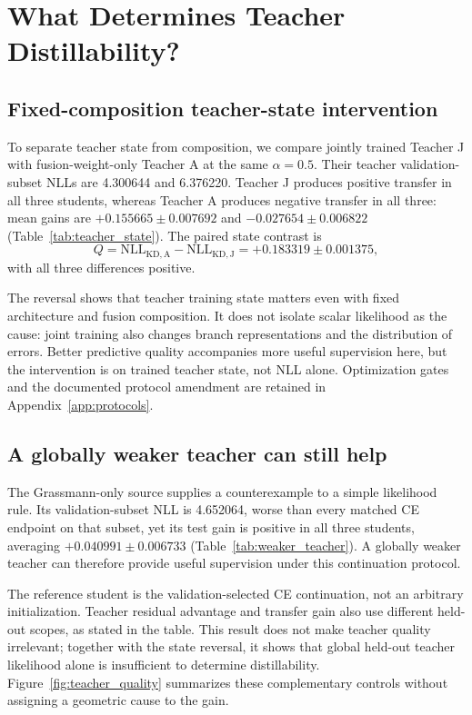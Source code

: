\section{What Determines Teacher Distillability?}
\label{sec:distillability}

\subsection{Fixed-composition teacher-state intervention}
\label{sec:teacher-state}

To separate teacher state from composition, we compare jointly trained Teacher J with fusion-weight-only Teacher A at the same $\alpha=0.5$. Their teacher validation-subset NLLs are 4.300644 and 6.376220. Teacher J produces positive transfer in all three students, whereas Teacher A produces negative transfer in all three: mean gains are $+0.155665\pm0.007692$ and $-0.027654\pm0.006822$ (Table~\ref{tab:teacher_state}). The paired state contrast is
\begin{equation}
Q=\mathrm{NLL}_{\mathrm{KD,A}}-\mathrm{NLL}_{\mathrm{KD,J}}
=+0.183319\pm0.001375,
\label{eq:teacher-state-contrast}
\end{equation}
with all three differences positive.

The reversal shows that teacher training state matters even with fixed architecture and fusion composition. It does not isolate scalar likelihood as the cause: joint training also changes branch representations and the distribution of errors. Better predictive quality accompanies more useful supervision here, but the intervention is on trained teacher state, not NLL alone. Optimization gates and the documented protocol amendment are retained in Appendix~\ref{app:protocols}.

\subsection{A globally weaker teacher can still help}
\label{sec:weaker-teacher}

The Grassmann-only source supplies a counterexample to a simple likelihood rule. Its validation-subset NLL is 4.652064, worse than every matched CE endpoint on that subset, yet its test gain is positive in all three students, averaging $+0.040991\pm0.006733$ (Table~\ref{tab:weaker_teacher}). A globally weaker teacher can therefore provide useful supervision under this continuation protocol.

The reference student is the validation-selected CE continuation, not an arbitrary initialization. Teacher residual advantage and transfer gain also use different held-out scopes, as stated in the table. This result does not make teacher quality irrelevant; together with the state reversal, it shows that global held-out teacher likelihood alone is insufficient to determine distillability. Figure~\ref{fig:teacher_quality} summarizes these complementary controls without assigning a geometric cause to the gain.

